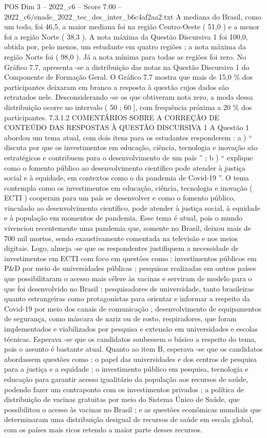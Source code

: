 \begin{textsample}{POS Dim 3 – 2022\_c6 – Score 7.00 – 2022\_c6/enade\_2022\_tec\_des\_inter\_b6c4af2aa2.txt}
A mediana do Brasil, como um todo, foi 46,5, a maior mediana foi na região Centro-Oeste ( 51,0 ) e a menor foi a região Norte ( 38,3 ).
A nota máxima da Questão Discursiva 1 foi 100,0, obtida por, pelo menos, um estudante em quatro regiões ; a nota máxima da região Norte foi ( 98,0 ).
Já a nota mínima para todas as regiões foi zero.
No Gráfico 7.7, apresenta -se a distribuição das notas na Questão Discursiva 1 do Componente de Formação Geral.
O Gráfico 7.7 mostra que mais de 15,0 \% dos participantes deixaram em branco a resposta à questão cujos dados são retratados nele.
Desconsiderando -se os que obtiveram nota zero, a moda dessa distribuição ocorre no intervalo ( 50 ; 60 ], com frequência próxima a 20 \% dos participantes. 7.3.1.2 COMENTÁRIOS SOBRE A CORREÇÃO DE CONTEÚDO DAS RESPOSTAS À QUESTÃO DISCURSIVA 1 A Questão 1 abordou um tema atual, com dois itens para os estudantes responderem : a ) “ discuta por que os investimentos em educação, ciência, tecnologia e inovação são estratégicos e contribuem para o desenvolvimento de um país ” ; b ) “ explique como o fomento público ao desenvolvimento científico pode atender à justiça social e à equidade, em contextos como o da pandemia de Covid-19 ”.
O tema contempla como os investimentos em educação, ciência, tecnologia e inovação ( ECTI ) cooperam para um país se desenvolver e como o fomento público, vinculado ao desenvolvimento científico, pode atender à justiça social, à equidade e à população em momentos de pandemia.
Esse tema é atual, pois o mundo vivenciou recentemente uma pandemia que, somente no Brasil, deixou mais de 700 mil mortos, sendo exaustivamente comentada na televisão e nos meios digitais.
Logo, almeja -se que os respondentes justifiquem a necessidade de investimentos em ECTI com foco em questões como : investimentos públicos em P\&D por meio de universidades públicas ; pesquisas realizadas em outros países que possibilitaram o acesso mais célere às vacinas e serviram de modelo para o que foi desenvolvido no Brasil ; pesquisadores de universidade, tanto brasileiras quanto estrangeiras como protagonistas para orientar e informar a respeito da Covid-19 por meio dos canais de comunicação ; desenvolvimento de equipamentos de segurança, como máscara de nariz ou de rosto, respiradores, que foram implementados e viabilizados por pesquisa e extensão em universidades e escolas técnicas.
Esperava -se que os candidatos soubessem o básico a respeito do tema, pois o assunto é bastante atual.
Quanto ao item B, esperava -se que os candidatos abordassem questões como : o papel das universidades e dos centros de pesquisa para a justiça e a equidade ; o investimento público em pesquisa, tecnologia e educação para garantir acesso igualitário da população aos recursos de saúde, podendo fazer um contraponto com os investimentos privados ; a política de distribuição de vacinas gratuitas por meio do Sistema Único de Saúde, que possibilitou o acesso às vacinas no Brasil ; e as questões econômicas mundiais que determinaram uma distribuição desigual de recursos de saúde em escala global, com os países mais ricos retendo a maior parte desses recursos.

\end{textsample}
